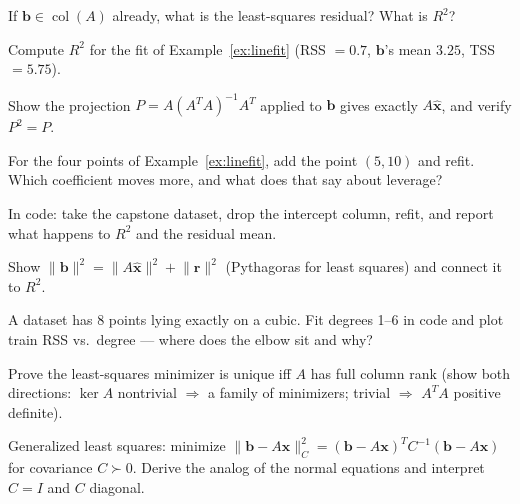 \begin{exercise}[easy]
If $\mathbf b\in\operatorname{col}(A)$ already, what is the least-squares
residual? What is $R^{2}$?
\end{exercise}

\begin{exercise}[easy]
Compute $R^{2}$ for the fit of Example~\ref{ex:linefit} (RSS $=0.7$,
$\mathbf b$'s mean $3.25$, TSS $=5.75$).
\end{exercise}

\begin{exercise}[medium]
Show the projection $P=A(A^{T}A)^{-1}A^{T}$ applied to $\mathbf b$ gives
exactly $A\hat{\mathbf x}$, and verify $P^2=P$.
\end{exercise}

\begin{exercise}[medium]
For the four points of Example~\ref{ex:linefit}, add the point
$(5,10)$ and refit. Which coefficient moves more, and what does that say
about leverage?
\end{exercise}

\begin{exercise}[medium]
In code: take the capstone dataset, drop the intercept column, refit, and
report what happens to $R^{2}$ and the residual mean.
\end{exercise}

\begin{exercise}[medium]
Show $\lVert\mathbf b\rVert^{2}=\lVert A\hat{\mathbf x}\rVert^{2}
+\lVert\mathbf r\rVert^{2}$ (Pythagoras for least squares) and connect it
to $R^{2}$.
\end{exercise}

\begin{exercise}[medium]
A dataset has 8 points lying exactly on a cubic. Fit degrees
1--6 in code and plot train RSS vs.\ degree --- where does the elbow sit
and why?
\end{exercise}

\begin{exercise}[hard]
Prove the least-squares minimizer is unique iff $A$ has full column rank
(show both directions: $\ker A$ nontrivial $\Rightarrow$ a family of
minimizers; trivial $\Rightarrow$ $A^{T}A$ positive definite).
\end{exercise}

\begin{exercise}[hard]
Generalized least squares: minimize
$\lVert\mathbf b-A\mathbf x\rVert_{C}^{2}=(\mathbf b-A\mathbf x)^{T}C^{-1}
(\mathbf b-A\mathbf x)$ for covariance $C\succ0$. Derive the analog of the
normal equations and interpret $C=I$ and $C$ diagonal.
\end{exercise}

